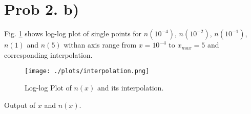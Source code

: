 \section{Prob 2. b)}

Fig. \ref{fig:fig3} shows log-log plot of single points for $n(10^{-4})$, $n(10^{-2})$, $n(10^{-1})$, $n(1)$ and $n(5)$ withan axis range from $x=10^{-4}$ to $x_{max}=5$  and corresponding interpolation.


\begin{figure}[ht!]
  \centering
  \texttt{[image: ./plots/interpolation.png]}
  \caption{Log-log Plot of $n(x)$ and its interpolation.}
  \label{fig:fig3}
\end{figure}

Output of $x$ and $n(x)$.


